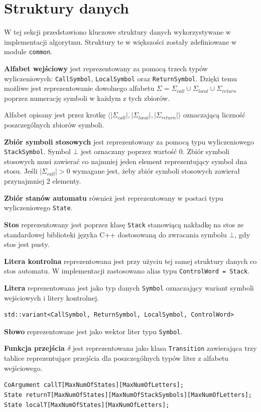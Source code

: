 \section{Struktury danych}

W tej sekcji przedstawiono kluczowe struktury danych wykorzystywane w implementacji algorytmu. Struktury te w większości zostały zdefiniowane w module \texttt{common}.

\textbf{Alfabet wejściowy} jest reprezentowany za pomocą trzech typów wyliczeniowych: \texttt{CallSymbol}, \texttt{LocalSymbol}
oraz \texttt{ReturnSymbol}. Dzięki temu możliwe jest reprezentowanie dowolnego alfabetu
$\Sigma = \Sigma_{call} \cup \Sigma_{local} \cup \Sigma_{return}$ poprzez numerację symboli w każdym z tych zbiorów. 

Alfabet opisany jest przez krotkę $\langle |\Sigma_{call}|, |\Sigma_{local}|, |\Sigma_{return}| \rangle$
oznaczającą liczność poszczególnych zbiorów symboli.

\textbf{Zbiór symboli stosowych} jest reprezentowany za pomocą typu wyliczeniowego \texttt{StackSymbol}.
Symbol $\bot$ jest oznaczany poprzez wartość 0. Zbiór symboli stosowych musi zawierać co najmniej jeden element
reprezentujący symbol dna stosu. Jeśli $|\Sigma_{call}| > 0$ wymagane jest, żeby zbiór symboli stosowych zawierał przynajmniej 2 elementy.

\textbf{Zbiór stanów automatu} również jest reprezentowany w postaci typu wyliczeniowego \texttt{State}.

\textbf{Stos} reprezentowany jest poprzez klasę \texttt{Stack} stanowiącą nakładkę na stos ze standardowej biblioteki języka C++
dostosowaną do zwracania symbolu $\bot$, gdy stos jest pusty.

\textbf{Litera kontrolna} reprezentowana jest przy użyciu tej samej struktury danych co stos automatu.
W implementacji zastosowano alias typu \texttt{ControlWord = Stack}. 

\textbf{Litera} reprezentowana jest jako typ danych \texttt{Symbol} oznaczający wariant symboli wejściowych i litery kontrolnej. 
\begin{verbatim}
std::variant<CallSymbol, ReturnSymbol, LocalSymbol, ControlWord>
\end{verbatim}

\textbf{Słowo} reprezentowane jest jako wektor liter typu \texttt{Symbol}.

\textbf{Funkcja przejścia $\delta$} jest reprezentowana jako klasa \texttt{Transition} zawierająca trzy tablice reprezentujące
przejścia dla poszczególnych typów liter z alfabetu wejściowego.
\begin{verbatim}
CoArgument callT[MaxNumOfStates][MaxNumOfLetters];
State returnT[MaxNumOfStates][MaxNumOfStackSymbols][MaxNumOfLetters];
State localT[MaxNumOfStates][MaxNumOfLetters];
\end{verbatim}

